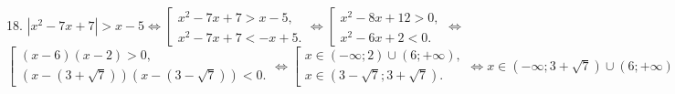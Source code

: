 18. $|x^2-7x+7|>x-5\Leftrightarrow \left[\begin{array}{l} x^2-7x+7>x-5,\\ x^2-7x+7<-x+5.\end{array}\right.\Leftrightarrow
\left[\begin{array}{l} x^2-8x+12>0,\\ x^2-6x+2<0.\end{array}\right.\Leftrightarrow$\\$
\left[\begin{array}{l} (x-6)(x-2)>0,\\ (x-(3+\sqrt{7}))(x-(3-\sqrt{7}))<0.\end{array}\right.\Leftrightarrow
\left[\begin{array}{l} x\in(-\infty;2)\cup(6;+\infty),\\ x\in(3-\sqrt{7};3+\sqrt{7}).\end{array}\right.\Leftrightarrow
x\in (-\infty;3+\sqrt{7})\cup(6;+\infty).$\\
